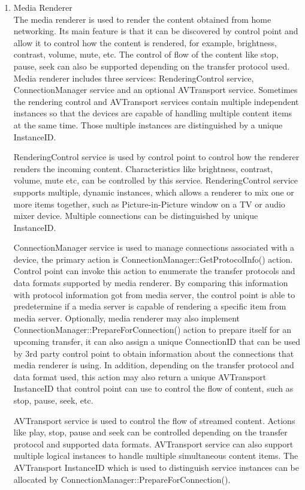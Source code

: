 \begin{enumerate}
\item Media Renderer \\
The media renderer is used to render the content obtained from home
networking. Its main feature is that it can be discovered by control point and
allow it to control how the content is rendered, for example, brightness,
contrast, volume, mute, etc. The control of flow of the content like stop,
pause, seek can also be supported depending on the transfer protocol used. Media
renderer includes three services: RenderingControl service, ConnectionManager
service and an optional AVTransport service. Sometimes the rendering control and
AVTransport services contain multiple independent instances so that the devices
are capable of handling multiple content items at the same time. Those multiple
instances are distinguished by a unique InstanceID.

RenderingControl service is used by control point to control how the renderer
renders the incoming content. Characteristics like brightness, contrast,
volume, mute etc, can be controlled by this service. RenderingControl service
supports multiple, dynamic instances, which allows a renderer to mix one or
more items together, such as Picture-in-Picture window on a TV or audio mixer
device. Multiple connections can be distinguished by unique InstanceID.

ConnectionManager service is used to manage connections associated with a
device, the primary action is ConnectionManager::GetProtocolInfo() action.
Control point can invoke this action to enumerate the transfer protocols and
data formats supported by media renderer. By comparing this information with
protocol information got from media server, the control point is able to
predetermine if a media server is capable of rendering a specific item from
media server. Optionally, media renderer may also implement
ConnectionManager::PrepareForConnection() action to prepare itself for an
upcoming transfer, it can also assign a unique ConnectionID that can be used by
3rd party control point to obtain information about the connections that media
renderer is using. In addition, depending on the transfer protocol and data
format used, this action may also return a unique AVTransport InstanceID that control
point can use to control the flow of content, such as stop, pause, seek, etc.

AVTransport service is used to control the flow of streamed content. Actions
like play, stop, pause and seek can be controlled depending on the transfer
protocol and supported data formats. AVTransport service can also support
multiple logical instances to handle multiple simultaneous content items. The
AVTransport InstanceID which is used to distinguish service instances can be
allocated by ConnectionManager::PrepareForConnection().


\end{enumerate}
